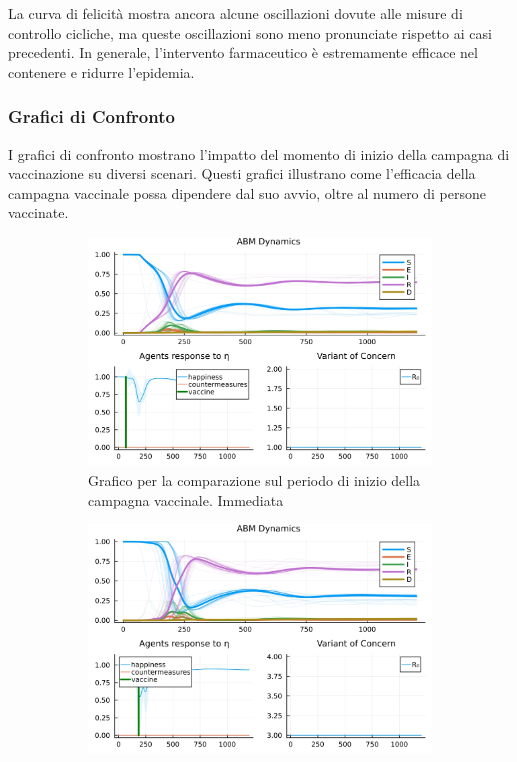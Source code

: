 La curva di felicità mostra ancora alcune oscillazioni dovute alle 
misure di controllo cicliche, ma queste oscillazioni sono meno 
pronunciate rispetto ai casi precedenti. In generale, l'intervento 
farmaceutico è estremamente efficace nel contenere e ridurre l'epidemia.

\subsubsection{Grafici di Confronto}

I grafici di confronto mostrano l'impatto del momento di inizio della 
campagna di vaccinazione su diversi scenari. Questi grafici illustrano 
come l'efficacia della campagna vaccinale possa dipendere dal suo avvio, 
oltre al numero di persone vaccinate.

\begin{figure}[H]
	\centering
	\begin{subfigure}[b]{0.45\textwidth}
		\centering
		\includegraphics[width=\textwidth]{img/SocialNetworkABM_1_V.jpg}
		\caption{Grafico per la comparazione sul periodo di inizio della campagna vaccinale. Immediata}
		\label{fig:comparison_vax_1}
	\end{subfigure}
	\hfill
	\begin{subfigure}[b]{0.45\textwidth}
		\centering
		\includegraphics[width=\textwidth]{img/SocialNetworkABM_3_V.jpg}

\end{subfigure}
\end{figure}
